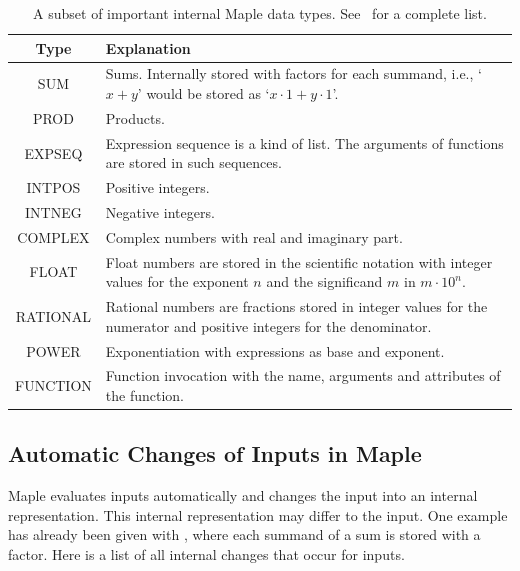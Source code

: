 \documentclass[a4paper,11pt]{article}
\newcommand{\Maple}{Maple}
\theoremstyle{defTheoStyle}
\theoremstyle{defExampStyle}
\begin{document}
\begin{table}[ht]
\centering
\begin{tabular}{cp{10cm}}
	\hline
	Type & Explanation\\
	\hline
	SUM & Sums. Internally stored with factors for each summand, i.e., `$x+y$' would be stored as `$x \cdot 1 + y \cdot 1$'.\\
	PROD & Products.\\
	EXPSEQ & Expression sequence is a kind of list. The arguments of functions are stored in such sequences.\\
	INTPOS & Positive integers.\\
	INTNEG & Negative integers.\\
	COMPLEX & Complex numbers with real and imaginary part.\\
	FLOAT & Float numbers are stored in the scientific notation with integer values for the exponent $n$ and the significand $m$ in $m \cdot 10^n$.\\
	RATIONAL & Rational numbers are fractions stored in integer values for the numerator and positive integers for the denominator.\\
	POWER & Exponentiation with expressions as base and exponent.\\
	FUNCTION & Function invocation with the name, arguments and attributes of the function.\\
	\hline
\end{tabular}
\caption{A subset of important internal \Maple{} data types. See~\parencite{MAPLE:ProgrammingGuide} for a complete list.}
\label{tab:maple-types}
\end{table}

\subsection{Automatic Changes of Inputs in Maple}\label{subsec:maple-probs}
\Maple{} evaluates inputs automatically and changes the input into an internal representation. This internal representation may differ to the input. One example has already been given with , where each summand of a sum is stored with a factor. Here is a list of all internal changes that occur for inputs.
\end{document}

